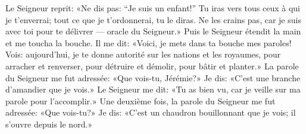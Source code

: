 Le Seigneur reprit: «Ne dis pas: “Je suis un enfant!”
	Tu iras vers tous ceux à qui je t’enverrai;
	tout ce que je t’ordonnerai, tu le diras.
Ne les crains pas, car je suis avec toi pour te délivrer --- oracle du Seigneur.»
Puis le Seigneur étendit la main et me toucha la bouche.
Il me dit:
	«Voici, je mets dans ta bouche mes paroles!
	Vois: aujourd’hui, je te donne autorité sur les nations et les royaumes,
	pour arracher et renverser, pour détruire et démolir, pour bâtir et planter.»
La parole du Seigneur me fut adressée:
	«Que vois-tu, Jérémie?»
	Je dis: «C’est une branche d’amandier que je vois.»
Le Seigneur me dit:
	«Tu as bien vu, car je veille sur ma parole pour l’accomplir.»
Une deuxième fois, la parole du Seigneur me fut adressée:
	«Que vois-tu?»
Je dis: «C’est un chaudron bouillonnant que je vois; il s’ouvre depuis le nord.»
